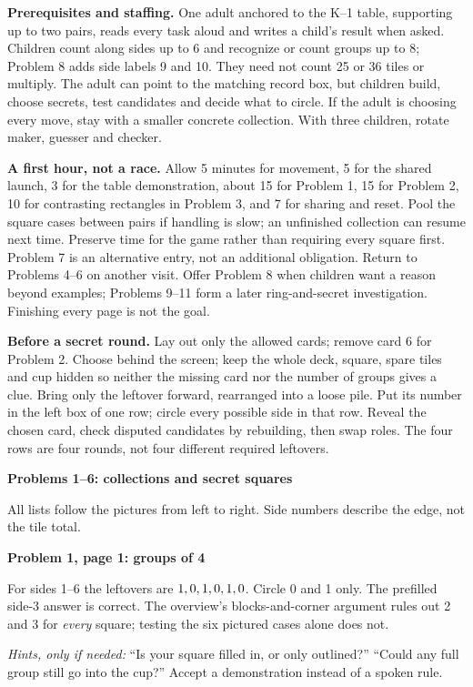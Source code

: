 \documentclass[11pt]{article}
\newcommand{\head}[1]{\par\textbf{\large #1}\par}
\newcommand{\sub}[1]{\par\textbf{#1}\par}
\begin{document}
\textbf{Prerequisites and staffing.} One adult anchored to the K--1 table, supporting up to two pairs, reads every task aloud and writes a child's result when asked. Children count along sides up to 6 and recognize or count groups up to 8; Problem 8 adds side labels 9 and 10. They need not count 25 or 36 tiles or multiply. The adult can point to the matching record box, but children build, choose secrets, test candidates and decide what to circle. If the adult is choosing every move, stay with a smaller concrete collection. With three children, rotate maker, guesser and checker.

\textbf{A first hour, not a race.} Allow 5 minutes for movement, 5 for the shared launch, 3 for the table demonstration, about 15 for Problem 1, 15 for Problem 2, 10 for contrasting rectangles in Problem 3, and 7 for sharing and reset. Pool the square cases between pairs if handling is slow; an unfinished collection can resume next time. Preserve time for the game rather than requiring every square first. Problem 7 is an alternative entry, not an additional obligation. Return to Problems 4--6 on another visit. Offer Problem 8 when children want a reason beyond examples; Problems 9--11 form a later ring-and-secret investigation. Finishing every page is not the goal.

\textbf{Before a secret round.} Lay out only the allowed cards; remove card 6 for Problem 2. Choose behind the screen; keep the whole deck, square, spare tiles and cup hidden so neither the missing card nor the number of groups gives a clue. Bring only the leftover forward, rearranged into a loose pile. Put its number in the left box of one row; circle every possible side in that row. Reveal the chosen card, check disputed candidates by rebuilding, then swap roles. The four rows are four rounds, not four different required leftovers.

\newpage
\head{Problems 1--6: collections and secret squares}
All lists follow the pictures from left to right. Side numbers describe the edge, not the tile total.

\sub{Problem 1, page 1: groups of 4}
For sides 1--6 the leftovers are $1, 0, 1, 0, 1, 0$. Circle 0 and 1 only. The prefilled side-3 answer is correct. The overview's blocks-and-corner argument rules out 2 and 3 for \emph{every} square; testing the six pictured cases alone does not.

\textit{Hints, only if needed:} ``Is your square filled in, or only outlined?'' ``Could any full group still go into the cup?'' Accept a demonstration instead of a spoken rule.
\end{document}
